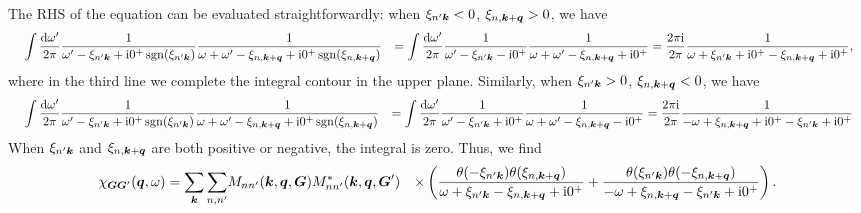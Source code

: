 \documentclass[hyperref, a4paper, 12pt]{report}
\DeclareMathOperator{\sgn}{sgn}
\newcommand*{\ii}{\mathrm{i}}
\def\\{}%
\begin{document}
The RHS of the equation can be evaluated straightforwardly:
when $\xi_{n' \vb*{k}} < 0$, $\xi_{n ,\vb*{k} + \vb*{q}} > 0$, 
we have 
\[
    \begin{aligned}
        &\quad \int \frac{\dd{\omega'}}{2\pi} 
        \frac{1}{\omega' - \xi_{n' \vb*{k}} + \ii 0^+ \sgn(\xi_{n' \vb*{k}})} 
        \frac{1}{\omega + \omega' - \xi_{n, \vb*{k} + \vb*{q}} + \ii 0^+ \sgn(\xi_{n, \vb*{k} + \vb*{q}})} \\
        &= \int \frac{\dd{\omega'}}{2\pi} 
        \frac{1}{\omega' - \xi_{n' \vb*{k}} - \ii 0^+ } 
        \frac{1}{\omega + \omega' - \xi_{n, \vb*{k} + \vb*{q}} + \ii 0^+ } \\
        &= \frac{2\pi \ii}{2\pi} \frac{1}{\omega
        + \xi_{n' \vb*{k}} + \ii 0^+ - \xi_{n, \vb*{k} + \vb*{q}} + \ii 0^+ },
    \end{aligned}
\]
where in the third line we complete the integral contour in the upper plane.
Similarly, when $\xi_{n' \vb*{k}} > 0$, $\xi_{n, \vb*{k} + \vb*{q}} < 0$, 
we have 
\[
    \begin{aligned}
        &\quad \int \frac{\dd{\omega'}}{2\pi} 
        \frac{1}{\omega' - \xi_{n' \vb*{k}} + \ii 0^+ \sgn(\xi_{n' \vb*{k}})} 
        \frac{1}{\omega + \omega' - \xi_{n, \vb*{k} + \vb*{q}} + \ii 0^+ \sgn(\xi_{n, \vb*{k} + \vb*{q}})} \\
        &= \int \frac{\dd{\omega'}}{2\pi} 
        \frac{1}{\omega' - \xi_{n' \vb*{k}} + \ii 0^+ } 
        \frac{1}{\omega + \omega' - \xi_{n, \vb*{k} + \vb*{q}} - \ii 0^+ } \\
        &= \frac{2\pi \ii}{2\pi} \frac{1}{
            - \omega + \xi_{n, \vb*{k} + \vb*{q}} + \ii 0^+ 
            - \xi_{n' \vb*{k}} + \ii 0^+
        }
    \end{aligned}
\]
When $\xi_{n' \vb*{k}}$ and $\xi_{n, \vb*{k} + \vb*{q}}$ are both positive or negative, 
the integral is zero.
Thus, we find 
\begin{equation}
    \begin{aligned}
        \chi_{\vb*{G} \vb*{G}'}(\vb*{q}, \omega) = \sum_{\vb*{k}} \sum_{n, n'} 
        &M_{n n'} (\vb*{k}, \vb*{q}, \vb*{G}) M^*_{nn'} (\vb*{k}, \vb*{q}, \vb*{G}') \\
        &\times \left(
            \frac{
                \theta(- \xi_{n' \vb*{k}}) \theta(\xi_{n, \vb*{k} + \vb*{q}})
            }{
                \omega + \xi_{n' \vb*{k}} - \xi_{n, \vb*{k} + \vb*{q}} + \ii 0^+
            }
            + \frac{
                \theta(\xi_{n' \vb*{k}}) \theta(- \xi_{n, \vb*{k} + \vb*{q}})
            }{
                - \omega + \xi_{n, \vb*{k} + \vb*{q}} - \xi_{n' \vb*{k}} + \ii 0^+
            }
        \right).
    \end{aligned}
\end{equation}
\end{document}
